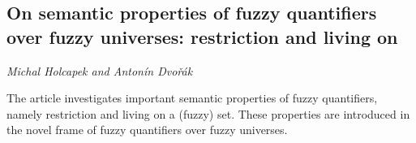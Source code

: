 \documentclass[../booklet.tex]{subfiles}
\begin{document}
\subsection[On semantic properties of fuzzy quantifiers over fuzzy universes:  restriction and living on. {\it Michal Holcapek and Antonín Dvořák}]{On semantic properties of fuzzy quantifiers over fuzzy universes:  restriction and living on}
 

\begin{center}
  {\it Michal Holcapek and Antonín Dvořák}
\end{center}

\vskip 0.8cm


The article investigates important semantic properties of fuzzy quantifiers, namely restriction and living on a (fuzzy) set. These properties are introduced in the novel frame of fuzzy quantifiers over fuzzy universes.

\end{document}
